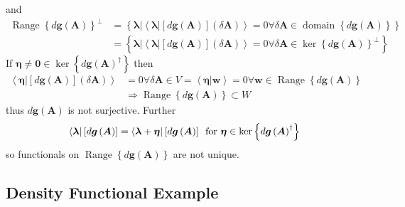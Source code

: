 \documentclass[aps,preprint]{revtex4}%
\begin{document}
and%
\begin{align}
\operatorname*{Range}\left\{  d\boldsymbol{g}\left(  \boldsymbol{A}\right)
\right\}  ^{\bot}  &  =\left\{  \left.  \boldsymbol{\lambda}\right\vert
\left\langle \left.  \boldsymbol{\lambda}\right\vert \left[  d\boldsymbol{g}%
\left(  \boldsymbol{A}\right)  \right]  \left(  \delta\boldsymbol{A}\right)
\right\rangle =0\forall\delta\boldsymbol{A}\in\operatorname*{domain}\left\{
d\boldsymbol{g}\left(  \boldsymbol{A}\right)  \right\}  \right\} \nonumber\\
&  =\left\{  \left.  \boldsymbol{\lambda}\right\vert \left\langle \left.
\boldsymbol{\lambda}\right\vert \left[  d\boldsymbol{g}\left(  \boldsymbol{A}%
\right)  \right]  \left(  \delta\boldsymbol{A}\right)  \right\rangle
=0\forall\delta\boldsymbol{A}\in\ker\left\{  d\boldsymbol{g}\left(
\boldsymbol{A}\right)  \right\}  ^{\bot}\right\}
\end{align}
If $\boldsymbol{\eta}\neq\boldsymbol{0\in}\ker\left\{  d\boldsymbol{g}\left(
\boldsymbol{A}\right)  ^{\dagger}\right\}  $ then
\begin{align}
\left\langle \left.  \boldsymbol{\eta}\right\vert \left[  d\boldsymbol{g}%
\left(  \boldsymbol{A}\right)  \right]  \left(  \delta\boldsymbol{A}\right)
\right\rangle  &  =0\forall\delta\boldsymbol{A}\in V=\left\langle \left.
\boldsymbol{\eta}\right\vert \boldsymbol{w}\right\rangle =0\forall
\boldsymbol{w\in}\operatorname*{Range}\left\{  d\boldsymbol{g}\left(
\boldsymbol{A}\right)  \right\} \nonumber\\
&  \Rightarrow\operatorname*{Range}\left\{  d\boldsymbol{g}\left(
\boldsymbol{A}\right)  \right\}  \subset W
\end{align}
thus $d\boldsymbol{g}\left(  \boldsymbol{A}\right)  $ is not surjective.
Further
\begin{equation}
\left\langle \boldsymbol{\lambda}\right\vert \left[  d\boldsymbol{g}\left(
\boldsymbol{A}\right)  \right]  =\left\langle \boldsymbol{\lambda
}+\boldsymbol{\eta}\right\vert \left[  d\boldsymbol{g}\left(  \boldsymbol{A}%
\right)  \right]  \text{ \thinspace for }\boldsymbol{\eta}\in\ker\left\{
d\boldsymbol{g}\left(  \boldsymbol{A}\right)  ^{\dagger}\right\}
\end{equation}
so functionals on $\operatorname*{Range}\left\{  d\boldsymbol{g}\left(
\boldsymbol{A}\right)  \right\}  $ are not unique.

\subsection{Density Functional Example}
\end{document}

